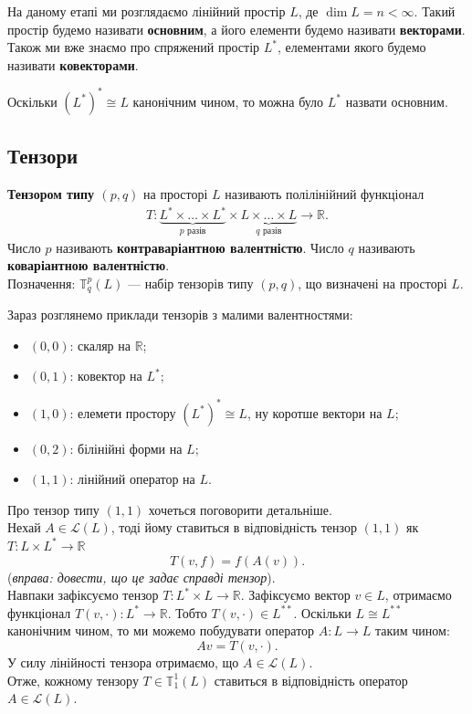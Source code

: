 \documentclass{math_library}
\begin{document}
На даному етапі ми розглядаємо лінійний простір $L$, де $\dim L = n < \infty$. Такий простір будемо називати \textbf{основним}, а його елементи будемо називати \textbf{векторами}. Також ми вже знаємо про спряжений простір $L^*$, елементами якого будемо називати \textbf{ковекторами}.

\begin{remark}
Оскільки $(L^*)^* \cong L$ канонічним чином, то можна було $L^*$ назвати основним.
\end{remark}

\subsection{Тензори}
\begin{definition}
\textbf{Тензором типу $(p,q)$} на просторі $L$ називають полілінійний функціонал
\begin{align*}
T \colon \underbrace{L^* \times \dots \times L^*}_{p \text{  разів}} \times \underbrace{L \times \dots \times L}_{q \text{  разів}} \to \mathbb{R}.
\end{align*}
Число $p$ називають \textbf{контраваріантною валентністю}. Число $q$ називають \textbf{коваріантною валентністю}.\\
Позначення: $\mathbb{T}_q^p(L)$ --- набір тензорів типу $(p,q)$, що визначені на просторі $L$.
\end{definition}

\begin{example}
Зараз розглянемо приклади тензорів з малими валентностями:
\begin{itemize}[nosep,wide=0pt,label={--}]
\item $(0,0)$: скаляр на $\mathbb{R}$;
\item $(0,1)$: ковектор на $L^*$;
\item $(1,0)$: елемети простору $(L^*)^* \cong L$, ну коротше вектори на $L$;
\item $(0,2)$: білінійні форми на $L$;
\item $(1,1)$: лінійний оператор на $L$.
\end{itemize}
\end{example}

\begin{example}
Про тензор типу $(1,1)$ хочеться поговорити детальніше.
\bigskip \\
Нехай $A \in \mathcal{L}(L)$, тоді йому ставиться в відповідність тензор $(1,1)$ як $T \colon L \times L^* \to \mathbb{R}$
\[
T(v,f) = f(A(v)).
\]
(\textit{вправа: довести, що це задає справді тензор}).
\bigskip \\
Навпаки зафіксуємо тензор $T \colon L^* \times L \to \mathbb{R}$. Зафіксуємо вектор $v \in L$, отримаємо функціонал $T(v, \cdot) \colon L^* \to \mathbb{R}$. Тобто $T(v,\cdot) \in L^{**}$. Оскільки $L \cong L^{**}$ канонічним чином, то ми можемо побудувати оператор $A \colon L \to L$ таким чином: 
\[
Av = T(v,\cdot).
\] 
У силу лінійності тензора отримаємо, що $A \in \mathcal{L}(L)$.\\
Отже, кожному тензору $T \in \mathbb{T}^1_1(L)$ ставиться в відповідність оператор $A \in \mathcal{L}(L)$.
\end{example}
\end{document}
